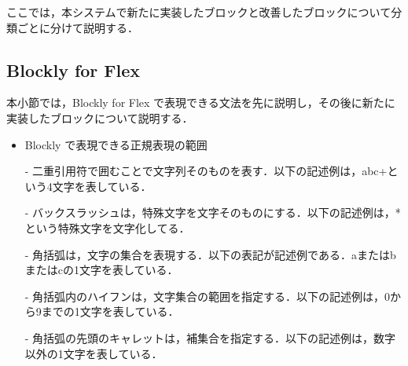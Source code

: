 \documentclass{risepaper}
\begin{document}
ここでは，本システムで新たに実装したブロックと改善したブロックについて分類ごとに分けて説明する．
   

   \subsection{Blockly for Flex}

本小節では，Blockly for Flex で表現できる文法を先に説明し，その後に新たに実装したブロックについて説明する．

\begin{itemize}

\item Blockly で表現できる正規表現の範囲

- 二重引用符で囲むことで文字列そのものを表す．以下の記述例は，abc+という4文字を表している．


- バックスラッシュは，特殊文字を文字そのものにする．以下の記述例は，* という特殊文字を文字化してる．

\shadowbox{
\begin{minipage}[t]{3cm}
\begin{verbatim}
\*
\end{verbatim}
\end{minipage}
}

- 角括弧は，文字の集合を表現する．以下の表記が記述例である．aまたはbまたはcの1文字を表している．

\shadowbox{
\begin{minipage}[t]{3cm}
\begin{verbatim}
[abc]
\end{verbatim}
\end{minipage}
}

- 角括弧内のハイフンは，文字集合の範囲を指定する．以下の記述例は，0から9までの1文字を表している．

\shadowbox{
\begin{minipage}[t]{3cm}
\begin{verbatim}
[0-9]
\end{verbatim}
\end{minipage}
}

- 角括弧の先頭のキャレットは，補集合を指定する．以下の記述例は，数字以外の1文字を表している．


\end{itemize}
\end{document}
